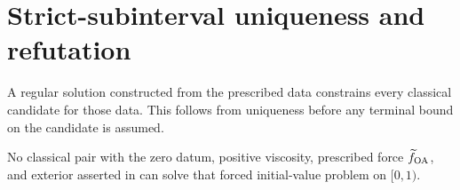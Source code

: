 

\section{Strict-subinterval uniqueness and refutation}
\label{r:sec:exclusion}

A regular solution constructed from the prescribed data constrains every
classical candidate for those data. This follows from uniqueness before
any terminal bound on the candidate is assumed.

\begin{theorem}
\label{r:thm:openai-exclusion}
No classical pair with the zero datum, positive viscosity, prescribed force
\(\widetilde f_{\rm OA}\), and exterior asserted in
\cite[Theorem~1.1]{openai-paper} can solve that forced initial-value problem
on \([0,1)\).
\end{theorem}

